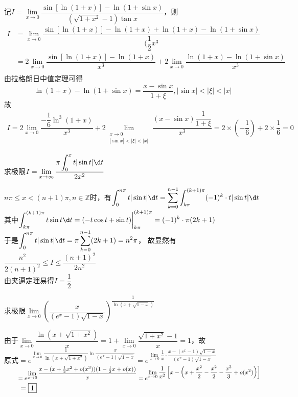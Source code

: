 \documentclass[12pt, a4paper, oneside, UTF8]{ctexbook}
\begin{document}
\begin{solution}
    记$I=\lim\limits_{x \to 0}\dfrac{\sin[\ln (1+x)] - \ln(1+\sin x)}{(\sqrt{1+x^2}-1)\tan x}$，则
    \begin{align*}
        I&=\lim\limits_{x \to 0}\dfrac{\sin[\ln (1+x)] - \ln(1+x)+\ln(1+x) - \ln(1+\sin x)}{(\dfrac{1}{2}x^3}\\
        &=2\lim\limits_{x \to 0}\dfrac{\sin[\ln (1+x)] - \ln(1+x)}{x^3} + 2\lim\limits_{x \to 0}\dfrac{\ln(1+x) - \ln(1+\sin x)}{x^3}\\
    \end{align*}
    由拉格朗日中值定理可得
    \[
    \ln(1+x)-\ln(1+\sin x) = \dfrac{x - \sin x}{1 +\xi} , |\sin x| < |\xi| < |x|
    \]
    故
    \begin{align*}
        I=2\lim\limits_{x \to 0}\dfrac{-\dfrac{1}{6}\ln^3(1+x)}{x^3}+ 2\lim\limits_{\substack{x \to 0 \\ |\sin x| < |\xi| < |x|}}\dfrac{(x-\sin x)\dfrac{1}{1+\xi}}{x^3}
        =2 \times \left(-\dfrac{1}{6}\right) + 2 \times \dfrac{1}{6} = \boxed{0}
    \end{align*}
\end{solution}
\begin{exercise}
    求极限$I=\lim\limits_{x \to \infty} \dfrac{\pi \displaystyle\int_{0}^{x} t|\sin t| \d t}{2x^2}$
\end{exercise}
\begin{solution}
    $n\pi \le x < (n+1)\pi , n \in \mathbb{Z}$时，有$\displaystyle\int_{0}^{n\pi}t|\sin t| \d t = \displaystyle\sum_{k=0}^{n-1}\displaystyle\int_{k\pi}^{(k+1)\pi} (-1)^k\cdot t|\sin t| \d t$\\
    其中$\displaystyle\int_{k\pi}^{(k+1)\pi}t\sin t \d t=(-t\cos t+\sin t)\bigg|_{k\pi}^{(k+1)\pi}=(-1)^k \cdot \pi(2k+1)$\\
    于是$\displaystyle\int_{0}^{n\pi} t|\sin t| \d t = \pi \displaystyle\sum_{k=0}^{n-1} (2k+1) = n^2 \pi$\quad ，
    故显然有$\dfrac{n^2}{2(n+1)^2}\le I \le \dfrac{(n+1)^2}{2n^2}$\\
    由夹逼定理易得$I=\boxed{\dfrac{1}{2}}$
\end{solution}
\begin{exercise}
    求极限$\lim\limits_{x \to 0}\left(\dfrac{x}{(e^x -1)\sqrt{1-x}}\right)^{\dfrac{1}{\ln(x+\sqrt{1-x})}}$
\end{exercise}
\begin{solution}
    由于$\lim\limits_{x \to 0}\dfrac{\ln(x+\sqrt{1+x^2})}{x}=1+\lim\limits_{x \to 0}\dfrac{\sqrt{1+x^2}-1}{x}=1$，故\\
    原式$=e^{\displaystyle\lim\limits_{x \to 0}\dfrac{1}{\ln(x+\sqrt{1+x^2})}\displaystyle\ln \dfrac{x}{(e^x-1)\sqrt{1-x}}}
    =e^{\displaystyle\lim\limits_{x \to 0}\dfrac{1}{x} \cdot \dfrac{x-(e^x -1)\sqrt{1-x}}{(e^x -1)\sqrt{1-x}}}$\\[6pt]
    $\text{\qquad}
    =e^{\displaystyle\lim\limits_{x \to 0}\dfrac{x-(x+\frac{1}{2}x^2 +o(x^3))(1-\frac{1}{2}x+o(x))}{x}}
    =e^{\displaystyle\lim\limits_{x \to 0}\dfrac{1}{x^2}\left[x-\left(x+\frac{x^2}{2}-\frac{x^2}{2}-\frac{x^3}{3}+o(x^2)\right)\right]}$\\[6pt]
    $\text{\qquad}
    =\boxed{1}$
\end{solution}
\end{document}
